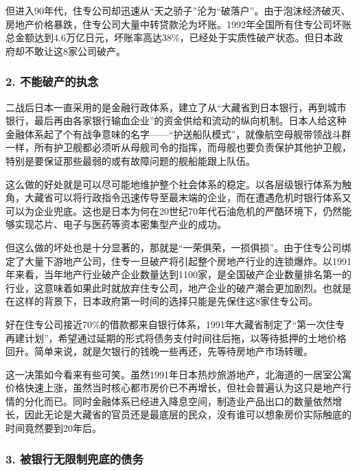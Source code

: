 {\fangsong 但进入90年代，住专公司却迅速从“天之骄子”沦为“破落户”。由于泡沫经济破灭、房地产价格暴跌，住专公司大量中转贷款沦为坏账。1992年全国所有住专公司坏账总金额达到4.6万亿日元，坏账率高达38\%，已经处于实质性破产状态。但日本政府却不敢让这8家公司破产。\par}

\subsubsection{2. 不能破产的执念}

{\fangsong 二战后日本一直采用的是金融行政体系，建立了从“大藏省到日本银行，再到城市银行，最后再由各家银行输血企业”的资金供给和流动的纵向机制。日本人给这种金融体系起了个有战争意味的名字——“护送船队模式”，就像航空母舰带领战斗群一样，所有护卫舰都必须听从母舰司令的指挥，而母舰也要负责保护其他护卫舰，特别是要保证那些最弱的或有故障问题的舰船能跟上队伍。\par}

{\fangsong 这么做的好处就是可以尽可能地维护整个社会体系的稳定。以各层级银行体系为触角，大藏省可以将行政指令迅速传导至最末端的企业，而在遭遇危机时银行体系又可以为企业兜底。这也是日本为何在20世纪70年代石油危机的严酷环境下，仍然能够实现芯片、电子与医药等资本密集型产业的成功。\par}

{\fangsong 但这么做的坏处也是十分显著的，那就是“一荣俱荣，一损俱损”。由于住专公司绑定了大量下游地产公司，住专一旦破产将引起整个房地产行业的连锁爆炸。以1991年来看，当年地产行业破产企业数量达到1100家，是全国破产企业数量排名第一的行业，这意味着如果此时就放弃住专公司，地产企业的破产潮会更加剧烈。也就是在这样的背景下，日本政府第一时间的选择只能是先保住这8家住专公司。\par}

{\fangsong 好在住专公司接近70\%的借款都来自银行体系，1991年大藏省制定了“第一次住专再建计划”，希望通过延期的形式将债务支付时间往后拖，以等待抵押的土地价格回升。简单来说，就是欠银行的钱晚一些再还，先等待房地产市场转暖。\par}

{\fangsong 这一决策如今看来有些可笑。虽然1991年日本热炒旅游地产，北海道的一居室公寓价格快速上涨，虽然当时核心都市房价已不再增长，但社会普遍认为这只是地产行情的分化而已。同时金融体系已经进入降息空间，制造业产品出口的数量依然增长，因此无论是大藏省的官员还是最底层的民众，没有谁可以想象房价实际触底的时间竟然要到20年后。\par}

\subsubsection{3. 被银行无限制兜底的债务}

